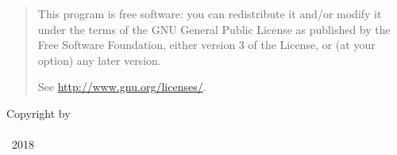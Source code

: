 \thispagestyle{empty}

\hfill

\vfill

\begin{center}
	\begin{quote}
		This program is free software: you can redistribute it and/or modify
		it under the terms of the GNU General Public License as published by
		the Free Software Foundation, either version 3 of the License, or
		(at your option) any later version.
		
		See \url{http://www.gnu.org/licenses/}.
	\end{quote}
	
	\vfill
	
	\noindent Copyright by \\ \medskip
	\myName \\
	\textcopyright\ 2018
\end{center}


%
%
%
%
%
